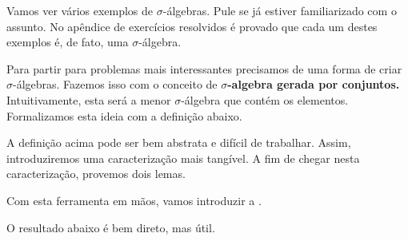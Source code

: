 \deMorgan

Vamos ver vários exemplos de \texorpdfstring{$\sigma$}{sigma}-álgebras. Pule se já estiver familiarizado com o assunto. No apêndice de exercícios resolvidos é provado que cada um destes exemplos é, de fato, uma \texorpdfstring{$\sigma$}{sigma}-álgebra.

\trivialSigmaAlgebra
\powerSetSigmaAlgebra
\countableSetsSigmaAlgebra

Para partir para problemas mais interessantes precisamos de uma forma de criar \texorpdfstring{$\sigma$}{sigma}-álgebras. Fazemos isso com o conceito de \textbf{\texorpdfstring{$\sigma$}{sigma}-algebra gerada por conjuntos.} Intuitivamente, esta será a menor $\sigma$-álgebra que contém os elementos. Formalizamos esta ideia com a definição abaixo.

\generatedSigmaAlgebra

A definição acima pode ser bem abstrata e difícil de trabalhar. Assim, introduziremos uma caracterização mais tangível. A fim de chegar nesta caracterização, provemos dois lemas.

\sigmaAlgebraIntersection
\generatedSigmaAlgebraIsUnique

Com esta ferramenta em mãos, vamos introduzir a .

\generatedSigmaAlgebraCharacterization

O resultado abaixo é bem direto, mas útil.

\sigmaAlgebraGeneratedBySubset